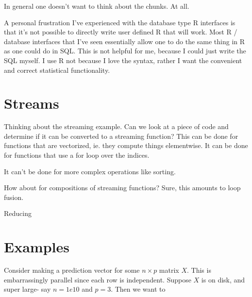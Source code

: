 \documentclass[12pt]{article}
\begin{document}
In general one doesn't want to think about the chunks. At all.

A personal frustration I've experienced with the database type R interfaces
is that it's not possible to directly write user defined R that will work.
Most R / database interfaces that I've seen essentially allow one to do the
same thing in R as one could do in SQL. This is not helpful for me, because
I could just write the SQL myself. I use R not because I love the syntax,
rather I want the convenient and correct statistical functionality.

\section{Streams}

Thinking about the streaming example. Can we look at a
piece of code and determine if it can be converted to a streaming function?
This can be done for functions that are vectorized, ie. they compute things
elementwise. It can be done for functions that use a for loop over the
indices. 

It can't be done for more complex operations like sorting.

How about for compositions of streaming functions? Sure, this amounts to
loop fusion.

Reducing

\section{Examples}

Consider making a prediction vector for some $n \times p$ matrix $X$. This
is embarrassingly parallel since each row is independent. Suppose $X$ is on
disk, and super large- say $n = 1e10$ and $p = 3$. Then we want to 


 
\end{document}
